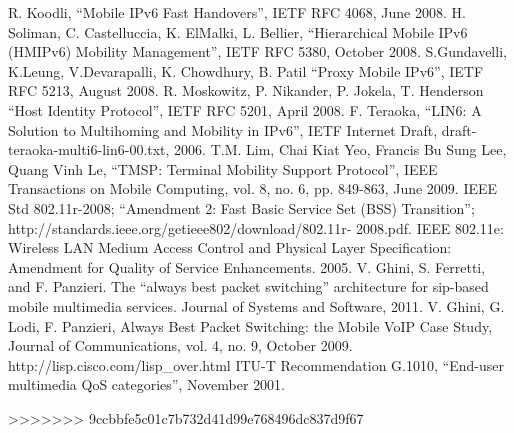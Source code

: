\begin{thebibliography}{90}
 R. Koodli, ``Mobile IPv6 Fast Handovers'', IETF RFC 4068, June 2008.
  H. Soliman, C. Castelluccia, K. ElMalki, L. Bellier, ``Hierarchical Mobile IPv6 (HMIPv6) Mobility Management'', IETF RFC 5380, October 2008.
 S.Gundavelli, K.Leung, V.Devarapalli, K. Chowdhury, B. Patil ``Proxy Mobile IPv6'', IETF RFC 5213, August 2008.
 R. Moskowitz, P. Nikander, P. Jokela, T. Henderson ``Host Identity Protocol'', IETF RFC 5201, April 2008. 
 F. Teraoka, ``LIN6: A Solution to Multihoming and Mobility in IPv6'', IETF Internet Draft, draft-teraoka-multi6-lin6-00.txt, 2006.
	T.M. Lim, Chai Kiat Yeo, Francis Bu Sung Lee, Quang Vinh Le, ``TMSP: Terminal Mobility Support Protocol'', IEEE Transactions on Mobile Computing, vol. 8, no. 6, pp. 849-863, June 2009.
 IEEE Std 802.11r-2008; ``Amendment 2: Fast Basic Service Set (BSS) Transition''; http://standards.ieee.org/getieee802/download/802.11r- 2008.pdf.
 IEEE 802.11e: Wireless LAN Medium Access Control and Physical Layer Specification: Amendment for Quality of Service Enhancements. 2005.
 V. Ghini, S. Ferretti, and F. Panzieri. The ``always best packet switching'' architecture for sip-based mobile multimedia services. Journal of Systems and Software, 2011.
 V. Ghini, G. Lodi, F. Panzieri, Always Best Packet Switching: the Mobile VoIP Case Study, Journal of Communications, vol. 4, no. 9, October 2009.
 http://lisp.cisco.com/lisp\_over.html
 ITU-T Recommendation G.1010, ``End-user multimedia QoS categories'', November 2001. 
\end{thebibliography}
>>>>>>> 9ccbbfe5c01c7b732d41d99e768496dc837d9f67
